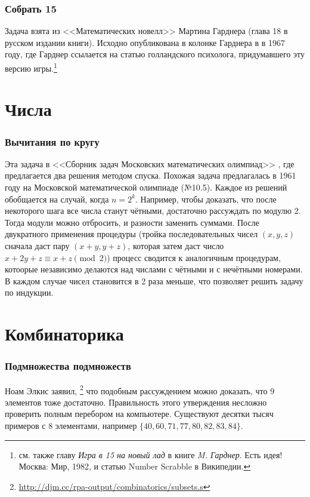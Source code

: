 \documentclass[twoside]{book}
\begin{document}
\subsubsection*{Собрать 15} %
Задача взята из <<Математических новелл>> Мартина Гарднера (глава 18 в русском издании книги). Исходно опубликована в колонке Гарднера в  в 1967 году, где Гарднер ссылается на статью голландского психолога, придумавшего эту версию игры.\footnote{см. также главу \emph{Игра в 15 на новый лад} в книге \emph{M. Гарднер}. Есть идея! Москва: Мир, 1982, и статью Number Scrabble в Википедии.}

\section{Числа}

\subsubsection*{Вычитания по кругу}
Эта задача  в <<Сборник задач Московских математических олимпиад>> \cite[№257, с. 73]{сборникМ}, где предлагается два решения методом спуска.
Похожая задача предлагалась в 1961 году на Московской математической олимпиаде (№10.5). 
Каждое из решений обобщается на случай, когда $n=2^k$.
Например, чтобы доказать, что после некоторого шага все числа станут чётными, достаточно рассуждать по модулю $2$.
Тогда модули можно отбросить, и разности  заменить суммами.
После двукратного применения процедуры (тройка последовательных чисел $(x,y,z)$ сначала даст пару $(x+y,y+z)$, которая затем даст число $x+2y+z\equiv x+z \pmod{2}$) процесс сводится к аналогичным  процедурам, котоорые независимо делаются над числами с чётными и с нечётными номерами. В каждом случае чисел становится в 2 раза меньше, что позволяет решить задачу по индукции.


\section{Комбинаторика}

\subsubsection*{Подмножества подмножеств}
Ноам Элкис заявил,%
\footnote{\url{http://djm.cc/rpa-output/combinatorics/subsets.s}} что подобным рассуждением можно доказать, что 9 элементов тоже достаточно.
Правильность этого утверждения несложно проверить полным перебором на компьютере.
Существуют десятки тысяч примеров с 8 элементами, например $\{40,60,71,77,80,82,83,84\}$. 
\end{document}
